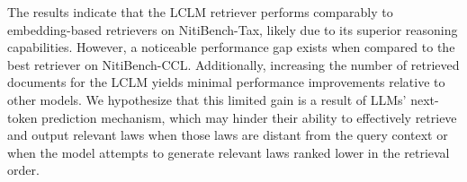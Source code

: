 The results indicate that the LCLM retriever performs comparably to embedding-based retrievers on NitiBench-Tax, likely due to its superior reasoning capabilities. 
%
However, a noticeable performance gap exists when compared to the best retriever on NitiBench-CCL.
%
Additionally, increasing the number of retrieved documents for the LCLM yields minimal performance improvements relative to other models. 
%
We hypothesize that this limited gain is a result of LLMs' next-token prediction mechanism, which may hinder their ability to effectively retrieve and output relevant laws when those laws are distant from the query context or when the model attempts to generate relevant laws ranked lower in the retrieval order.










